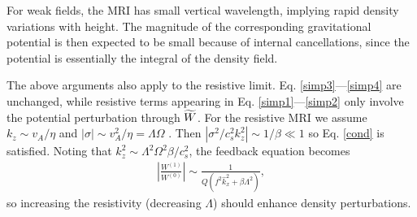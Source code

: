  For weak fields, the MRI has small vertical wavelength,
 implying rapid density variations with height. The magnitude of the
 corresponding gravitational potential is then expected to be small
 because of internal cancellations, since the potential is essentially
 the integral of the density field. 



The above arguments also apply to the resistive
limit. Eq. \ref{simp3}---\ref{simp4} are unchanged, while resistive
terms appearing in Eq. \ref{simp1}---\ref{simp2} only involve the
potential perturbation through $\widetilde{W}$. For the resistive MRI we assume
$k_z\sim v_A/\eta$ and $|\sigma|\sim v_A^2/\eta = \Lambda\Omega$
\citep{sano99}. Then $|\sigma^2/c_s^2k_z^2|\sim 1/\beta \ll 1$ so
Eq. \ref{cond} is satisfied. Noting that $k_z^2\sim
\Lambda^2\Omega^2\beta/c_s^2$, the feedback equation becomes
\begin{align}
  \left|\frac{W^{(1)}}{W^{(0)}}\right| \sim
  \frac{1}{Q\left(f^2\hat{k}_x^2 + \beta\Lambda^2\right)},
\end{align}
so increasing the resistivity (decreasing $\Lambda$) should enhance
density perturbations. 
 
